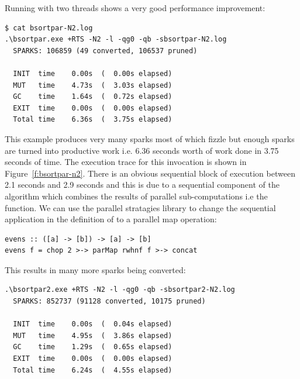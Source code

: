  Running with two threads shows a very good performance improvement:

\begin{verbatim}
$ cat bsortpar-N2.log
.\bsortpar.exe +RTS -N2 -l -qg0 -qb -sbsortpar-N2.log
  SPARKS: 106859 (49 converted, 106537 pruned)

  INIT  time    0.00s  (  0.00s elapsed)
  MUT   time    4.73s  (  3.03s elapsed)
  GC    time    1.64s  (  0.72s elapsed)
  EXIT  time    0.00s  (  0.00s elapsed)
  Total time    6.36s  (  3.75s elapsed)
\end{verbatim}

This example produces very many sparks most of which fizzle but enough sparks are turned into productive work i.e. 6.36 seconds worth of work done in 3.75 seconds of time. The execution trace for this invocation is shown in Figure~\ref{f:bsortpar-n2}. 
There is an obvious sequential block of execution between 2.1 seconds and 2.9 seconds and this is due to a sequential component of the algorithm which combines the results of parallel sub-computations i.e the  function. We can use the parallel stratagies library to change the sequential application in the definition of  to a parallel map operation:

\begin{lstlisting}
evens :: ([a] -> [b]) -> [a] -> [b]
evens f = chop 2 >-> parMap rwhnf f >-> concat
\end{lstlisting}

This results in many more sparks being converted:

\begin{lstlisting}
.\bsortpar2.exe +RTS -N2 -l -qg0 -qb -sbsortpar2-N2.log
  SPARKS: 852737 (91128 converted, 10175 pruned)

  INIT  time    0.00s  (  0.04s elapsed)
  MUT   time    4.95s  (  3.86s elapsed)
  GC    time    1.29s  (  0.65s elapsed)
  EXIT  time    0.00s  (  0.00s elapsed)
  Total time    6.24s  (  4.55s elapsed)
\end{lstlisting}

